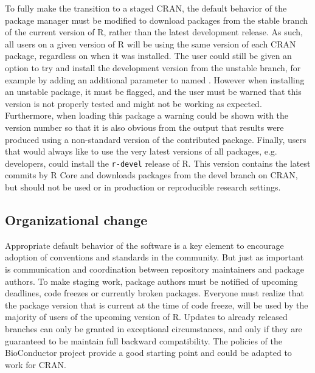 To fully make the transition to a staged CRAN, the default behavior of the
package manager must be modified to download packages from the stable branch of
the current version of R, rather than the latest development release. As such,
all users on a given version of R will be using the same version of each CRAN
package, regardless on when it was installed. The user could still be given an
option to try and install the development version from the unstable branch, for
example by adding an additional parameter to  named
. However when installing an unstable package, it must be
flagged, and the user must be warned that this version is not properly tested
and might not be working as expected. Furthermore, when loading this package a
warning could be shown with the version number so that it is also obvious from
the output that results were produced using a non-standard version of the
contributed package. Finally, users that would always like to use the very
latest versions of all packages, e.g. developers, could install the
\texttt{r-devel} release of R. This version contains the latest commits by R
Core and downloads packages from the devel branch on CRAN, but should not be
used or in production or reproducible research settings.

\subsection{Organizational change}

Appropriate default behavior of the software is a key element to encourage
adoption of conventions and standards in the community. But just as important is
communication and coordination between repository maintainers and package authors.
To make staging work, package authors must be notified of upcoming deadlines,
code freezes or currently broken packages. Everyone must realize that the
package version that is current at the time of code freeze, will be used by the
majority of users of the upcoming version of R. Updates to already released
branches can only be granted in exceptional circumstances, and only if they are
guaranteed to be maintain full backward compatibility. The policies of the
BioConductor project provide a good starting point and could be adapted to work
for CRAN.

